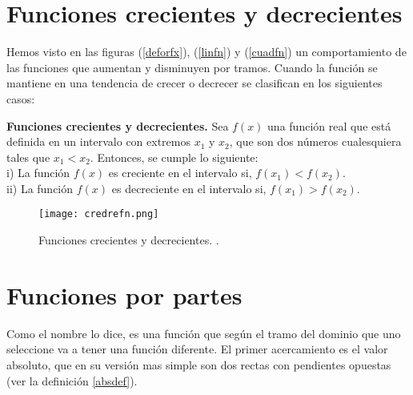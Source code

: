 \section{Funciones crecientes y decrecientes}
\label{funcrede}
Hemos visto en las figuras (\ref{deforfx}), (\ref{linfn}) y (\ref{cuadfn}) un comportamiento de las funciones que aumentan y disminuyen por tramos. Cuando la función se mantiene en una tendencia de crecer o decrecer se clasifican en los siguientes casos:
\begin{myexample}
\textbf{Funciones crecientes y decrecientes.} Sea $f(x)$ una función real que está definida en un intervalo con extremos $x_{1}$ y $x_{2}$, que son dos números cualesquiera tales que $x_{1}<x_{2}$. Entonces, se cumple lo siguiente:\\

\noindent i) La función $f(x)$ es creciente en el intervalo si, $f(x_{1})<f(x_{2})$. \\
\noindent ii) La función $f(x)$ es decreciente en el intervalo si, $f(x_{1})>f(x_{2})$.  \\

\begin{center}
\begin{figure}[h!]
\centering
\texttt{[image: credrefn.png]}
\caption[Funciones crecientes y decrecientes.]{Funciones crecientes y decrecientes. .} \label{credrefn}
\end{figure}
\end{center}
\end{myexample}
\section{Funciones por partes}
Como el nombre lo dice, es una función que según el tramo del dominio que uno seleccione va a tener una función diferente. El primer acercamiento es el valor absoluto, que en su versión mas simple son dos rectas con pendientes opuestas (ver la definición \ref{absdef}).\\

